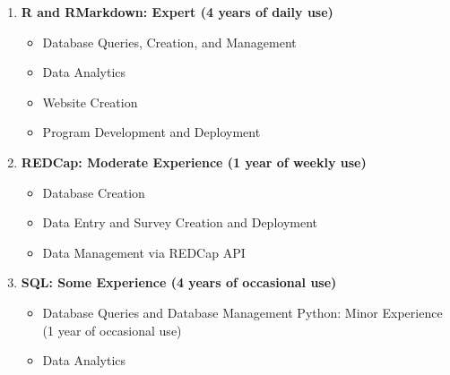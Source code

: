 \documentclass[]{DissertateUSU}
\providecommand{\tightlist}{%
  \setlength{\itemsep}{0pt}\setlength{\parskip}{0pt}}
\begin{document}
\begin{enumerate}
\def\labelenumi{\arabic{enumi}.}
\tightlist
\item
  \textbf{R and RMarkdown: Expert (4 years of daily use)}

  \begin{itemize}
  \tightlist
  \item
    Database Queries, Creation, and Management
  \item
    Data Analytics
  \item
    Website Creation
  \item
    Program Development and Deployment
  \end{itemize}
\item
  \textbf{REDCap: Moderate Experience (1 year of weekly use)}

  \begin{itemize}
  \tightlist
  \item
    Database Creation
  \item
    Data Entry and Survey Creation and Deployment
  \item
    Data Management via REDCap API
  \end{itemize}
\item
  \textbf{SQL: Some Experience (4 years of occasional use)}

  \begin{itemize}
  \tightlist
  \item
    Database Queries and Database Management Python: Minor Experience (1
    year of occasional use)
  \item
    Data Analytics
  \end{itemize}
\end{enumerate}
\end{document}

